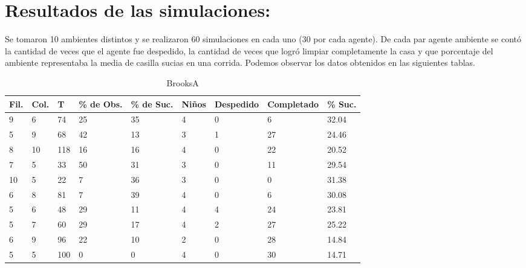 \documentclass[12pt]{article}
\begin{document}
\section{Resultados de las simulaciones:}
Se tomaron 10 ambientes distintos y se realizaron 60 simulaciones en cada uno (30 por cada agente). De cada par agente ambiente se cont\'o la cantidad de veces
que el agente fue despedido, la cantidad de veces que logr\'o limpiar completamente la casa y que porcentaje del ambiente representaba la media de casilla sucias en una corrida.
Podemos observar los datos obtenidos en las siguientes tablas.
\begin{table}[h]
	\small
	\begin{center}
		\begin{tabular} {| l | l  | l | l | l | l | l | l | l |}
			\hline
			Fil. & Col.& T & \% de Obs. & \% de Suc. & Ni\~nos & Despedido & Completado & \% Suc.\\ 
			\hline
			9 & 6 & 74 & 25 & 35 & 4 & 0 & 6 & 32.04 \\
			\hline
			5 & 9 & 68 & 42 & 13 & 3 & 1 & 27 & 24.46 \\
			\hline
			8 & 10 & 118 & 16 & 16 & 4 & 0 & 22 & 20.52 \\ 
			\hline
			7 & 5 & 33 & 50 & 31 & 3 & 0 & 11 & 29.54 \\ 
			\hline 
			10 & 5 & 22 & 7 & 36 & 3 & 0 & 0 & 31.38 \\ 
			\hline
			6 & 8 & 81 & 7 & 39 & 4 & 0 & 6 & 30.08 \\ 
			\hline
			5 & 6 & 48 & 29 & 11 & 4 & 4 & 24 & 23.81 \\
			\hline
			5 & 7 & 60 & 29 & 17 & 4 & 2 & 27 & 25.22 \\ 
			\hline
			6 & 9 & 96 & 22 & 10 & 2 & 0 & 28 & 14.84 \\ 
			\hline
			5 & 5 & 100 & 0 & 0 & 4 & 0 & 30 & 14.71 \\ 
			\hline
	 	\end{tabular}
		\caption{BrooksA}
	\end{center}	
\end{table}
\end{document}
